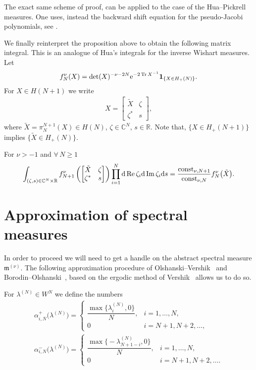 \begin{Remark}The exact same scheme of proof, can be applied to the case of the Hua--Pickrell measures. One uses, instead the backward shift equation for the pseudo-Jacobi polynomials, see \cite[Section~9.9]{HypergeometricOrthogonalPolynomials}.
\end{Remark}

We finally reinterpret the proposition above to obtain the following matrix integral. This is an analogue of Hua's integrals \cite{Hua,Neretin} for the inverse Wishart measures. Let
\begin{gather*}
f_{N}^{\nu}(X)=\det(X)^{-\nu-2N} {\rm e}^{-2\operatorname{Tr}X^{-1}}\mathbf{1}_{\{X \in H_+(N)\}}.
\end{gather*}
For $X\in H(N+1)$ we write
\begin{gather*}
X=\begin{bmatrix}
\tilde{X} & \zeta \\
\zeta^* & s
\end{bmatrix},
\end{gather*}
where $\tilde{X}=\pi_N^{N+1}(X) \in H(N)$, $\zeta \in \mathbb{C}^{N}$, $s \in \mathbb{R}$. Note that, $\{X \in H_+(N+1)\}$ implies $\{\tilde{X} \in H_+(N)\}$.
\begin{Corollary}
For $\nu>-1$ and $\forall\, N \ge 1$
\begin{gather*}
\int_{(\zeta,s)\in \mathbb{C}^N\times \mathbb{R}}^{}f_{N+1}^{\nu}\left(\begin{bmatrix}
\tilde{X} & \zeta \\
\zeta^* & s
\end{bmatrix}\right)\prod_{i=1}^{N}{\rm d} \operatorname{Re} \zeta_i {\rm d}\operatorname{Im} \zeta_i {\rm d}s=\frac{\operatorname{const}_{\nu, N+1}}{\operatorname{const}_{\nu, N}}f_{N}^{\nu}\big(\tilde{X}\big).
\end{gather*}
\end{Corollary}

\section{Approximation of spectral measures}\label{section3}
In order to proceed we will need to get a handle on the abstract spectral measure $\mathfrak{m}^{(\nu)}$. The following approximation procedure of Olshanski--Vershik~\cite{OlshanskiVershik} and Borodin--Olshanski~\cite{BorodinOlshanskiErgodic}, based on the ergodic method of Vershik~\cite{VershikErgodic} allows us to do so.

For $\lambda^{(N)} \in W^N$ we define the numbers
\begin{gather*}
\alpha_{i,N}^+\big(\lambda^{(N)}\big) =\begin{cases}
\dfrac{\max\big\{\lambda^{(N)}_{i},0\big\}}{N},& i=1,\dots, N,\\
0 & i=N+1,N+2,\dots,
\end{cases} \\
\alpha_{i,N}^-\big(\lambda^{(N)}\big) =\begin{cases}
\dfrac{\max\big\{{-}\lambda^{(N)}_{N+1-i},0\big\}}{N}, & i=1,\dots, N,\\
0 & i=N+1,N+2,\dots.
\end{cases}
\end{gather*}

